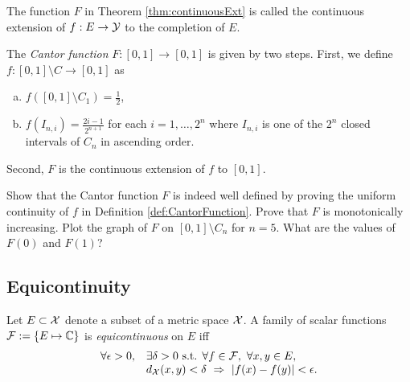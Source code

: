 \begin{defn}
  \label{def:continuousExt}
  The function $F$ in Theorem \ref{thm:continuousExt}
  is called the continuous extension of $f:E\rightarrow {\cal Y}$
  to the completion of $E$.
\end{defn}

\begin{defn}
  \label{def:CantorFunction}
  The \emph{Cantor function} $F:[0,1]\rightarrow[0,1]$
  is given by two steps.
  First, we define $f:[0,1]\setminus C \rightarrow[0,1]$
  as
  \begin{enumerate}[(a)]\itemsep0em
  \item %
    $f([0,1]\setminus C_1)=\frac{1}{2}$,
  \item $f(I_{n,i})=\frac{2i-1}{2^{n+1}}$
    for each $i=1,\ldots,2^n$
    where $I_{n,i}$ is one of the $2^{n}$ closed intervals
    of $C_n$ in ascending order.
  \end{enumerate}
  Second, $F$ is the continuous extension of $f$
  to $[0,1]$. 
\end{defn}

\begin{exc}
  \label{exc:CantorFuncWellDefined}
  Show that the Cantor function $F$
  is indeed well defined
  by proving the uniform continuity
  of $f$ in Definition \ref{def:CantorFunction}.
  Prove that $F$ is monotonically increasing.
  Plot the graph of $F$
  on $[0,1]\setminus C_n$ for $n=5$. 
  What are the values of $F(0)$ and $F(1)$?
\end{exc}

\subsection{Equicontinuity}

\begin{defn}
  \label{def:equcontinuity}
  Let $E\subset{\cal X}$ denote a subset
  of a metric space ${\cal X}$.
  A family of scalar functions
  ${\cal F}:=\{E\mapsto \mathbb{C}\}$
  is \emph{equicontinuous} on $E$
  iff
  \begin{equation}
    \label{eq:equcontinuity}
    \begin{array}{{rl}}
    \forall \epsilon>0, &\exists \delta>0 \text{ s.t. }
    \forall f\in{\cal F},\ \forall x,y\in E,\ \\
      &d_{\cal X}(x,y)<\delta\ \Rightarrow\ |f(x)-f(y)|<\epsilon.
    \end{array}
  \end{equation}
\end{defn}


